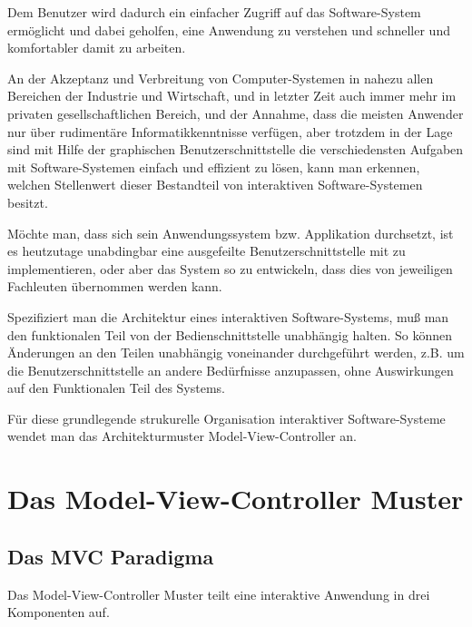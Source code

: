 \documentclass[11pt,a4paper,titlepage]{scrreprt}
\begin{document}
Dem Benutzer wird dadurch ein einfacher Zugriff auf das Software-System ermöglicht und
dabei geholfen, eine Anwendung zu verstehen und schneller und komfortabler damit zu arbeiten.

An der Akzeptanz und Verbreitung von Computer-Systemen in nahezu allen Bereichen der Industrie
und Wirtschaft, und in letzter Zeit auch immer mehr im privaten gesellschaftlichen Bereich, und
der Annahme, dass die meisten Anwender nur über rudimentäre
Informatikkenntnisse verfügen, aber trotzdem in der Lage sind mit Hilfe der graphischen
Benutzerschnittstelle die verschiedensten Aufgaben mit Software-Systemen einfach und effizient
zu lösen, kann man erkennen, welchen Stellenwert dieser Bestandteil von interaktiven
Software-Systemen besitzt.

Möchte man, dass sich sein Anwendungssystem bzw. Applikation durchsetzt, ist es heutzutage
unabdingbar eine ausgefeilte Benutzerschnittstelle mit zu implementieren, oder aber 
das System so zu entwickeln, dass dies von jeweiligen Fachleuten übernommen werden kann.

Spezifiziert man die Architektur eines interaktiven Software-Systems, muß man den funktionalen
Teil von der Bedienschnittstelle unabhängig halten. So können Änderungen an den Teilen
unabhängig voneinander durchgeführt werden, z.B. um die Benutzerschnittstelle an andere
Bedürfnisse anzupassen, ohne Auswirkungen auf den Funktionalen Teil des Systems.

Für diese grundlegende strukurelle Organisation interaktiver Software-Systeme wendet man
das Architekturmuster Model-View-Controller an.

\chapter{Das Model-View-Controller Muster}
\section{Das MVC Paradigma}
Das Model-View-Controller Muster teilt eine interaktive Anwendung in drei Komponenten auf.
\end{document}
